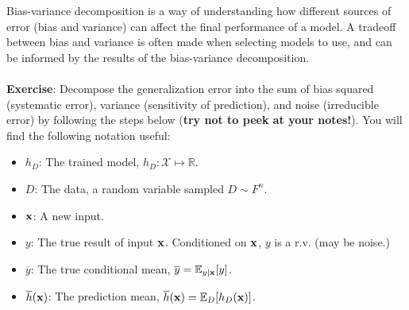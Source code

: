\documentclass[12pt,letterpaper]{article}
\begin{document}
Bias-variance decomposition is a way of understanding how different sources of error (bias and variance) can affect the final performance of a model. A tradeoff between bias and variance is often made when selecting models to use, and can be informed by the results of the bias-variance decomposition.
\\ \\
\noindent \textbf{Exercise}: Decompose the generalization error into the sum of bias squared (systematic error), variance (sensitivity of prediction), and noise (irreducible error) by following the steps below (\textbf{try not to peek at your notes!}). You will find the following notation useful:
\begin{itemize}
  \item $h_D$: The trained model, $h_D: \mathcal{X} \mapsto \mathbb{R}$.
  \item $D$: The data, a random variable sampled $D\sim F^n$.
  \item $\mathbf{x}$: A new input. 
  \item $y$: The true result of input $\mathbf{x}$. Conditioned on $\mathbf{x}$, $y$ is a r.v.
  (may be noise.)
  \item $\overline{y}$: The true conditional mean, $\overline{y}=\mathbb{E}_{y|\mathbf{x}}[y]$.
  \item $\overline{h}(\mathbf{x})$: The prediction mean, $\overline{h}(\mathbf{x})=\mathbb{E}_D[h_D(\mathbf{x})]$.
\end{itemize}
\end{document}
